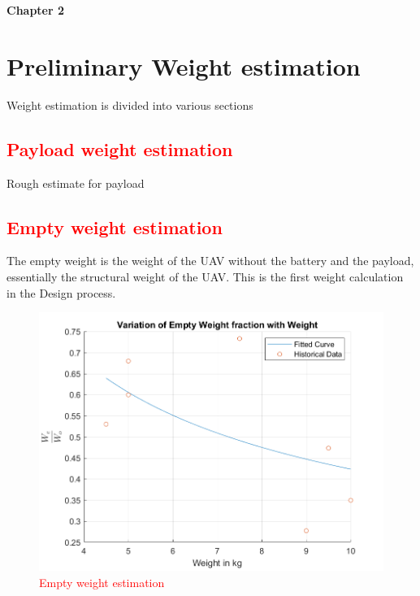 \documentclass[12 pt]{article}
\begin{document}
\textbf{\Huge{Chapter 2}}

\section{Preliminary Weight estimation}

Weight estimation is divided into various sections
\subsection{\textcolor{red}{Payload weight estimation}}
Rough estimate for payload
\begin{table}[h]
\centering
{}
\caption{Payload weight estimate}
\label{Payload weight}
\end{table}

\subsection{\textcolor{red}{Empty weight estimation}}
The empty weight is the weight of the UAV without the battery and the payload, essentially the structural weight of the UAV. 
This is the first weight calculation in the Design process. \\

\begin{figure}[h]
    \centering
    \includegraphics[width = 0.6\linewidth]{Codes/Week 2/Empty_weight.png}
    \caption{\textcolor{red}{Empty weight estimation}}
    \label{Empty Weight estimation}
\end{figure}
\end{document}
